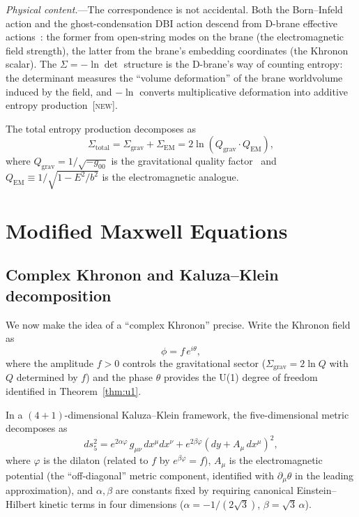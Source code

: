 \documentclass[prl,twocolumn,superscriptaddress,longbibliography]{revtex4-2}
\newcommand{\Sgrav}{\Sigma_{\mathrm{grav}}}
\newcommand{\Sem}{\Sigma_{\mathrm{EM}}}
\newcommand{\Stot}{\Sigma_{\mathrm{total}}}
\newcommand{\Qgrav}{Q_{\mathrm{grav}}}
\newcommand{\Qem}{Q_{\mathrm{EM}}}
\newcommand{\new}{\textsc{[new]}}
\begin{document}
\textit{Physical content.}---The correspondence is not
accidental.
Both the Born--Infeld action and the ghost-condensation DBI
action descend from D-brane effective
actions~\cite{Polchinski1998,BlanchetSkordis2024}: the former
from open-string modes on the brane (the electromagnetic field
strength), the latter from the brane's embedding coordinates
(the Khronon scalar).
The $\Sigma = -\ln\det$ structure is the D-brane's way of
counting entropy: the determinant measures the ``volume
deformation'' of the brane worldvolume induced by the field,
and $-\ln$ converts multiplicative deformation into additive
entropy production~\new{}.

The total entropy production decomposes as
\begin{equation}
  \Stot = \Sgrav + \Sem
  = 2\ln(\Qgrav \cdot \Qem),
  \label{eq:Sigma_total}
\end{equation}
where $\Qgrav = 1/\sqrt{-g_{00}}$ is the gravitational
quality factor~\cite{PaperII} and
$\Qem \equiv 1/\sqrt{1 - E^2/b^2}$ is the electromagnetic
analogue.

\section{Modified Maxwell Equations}
\label{sec:maxwell}

\subsection{Complex Khronon and Kaluza--Klein decomposition}

We now make the idea of a ``complex Khronon'' precise.
Write the Khronon field as
\begin{equation}
  \phi = f\, e^{i\theta},
  \label{eq:complex_khronon}
\end{equation}
where the amplitude $f > 0$ controls the gravitational
sector ($\Sgrav = 2\ln Q$ with $Q$ determined by $f$)
and the phase $\theta$ provides the U(1) degree of freedom
identified in Theorem~\ref{thm:u1}.

In a $(4+1)$-dimensional Kaluza--Klein framework, the five-dimensional
metric decomposes as~\cite{Kaluza1921,Klein1926}
\begin{equation}
  ds_5^2 = e^{2\alpha\varphi}\,g_{\mu\nu}\,dx^\mu dx^\nu
  + e^{2\beta\varphi}\!(dy + A_\mu\,dx^\mu)^2,
  \label{eq:KK}
\end{equation}
where $\varphi$ is the dilaton (related to $f$ by
$e^{\beta\varphi} = f$), $A_\mu$ is the electromagnetic
potential (the ``off-diagonal'' metric component, identified
with $\partial_\mu\theta$ in the leading approximation), and
$\alpha,\beta$ are constants fixed by requiring canonical
Einstein--Hilbert kinetic terms in four dimensions
($\alpha = -1/(2\sqrt{3})$, $\beta = \sqrt{3}\,\alpha$).
\end{document}
